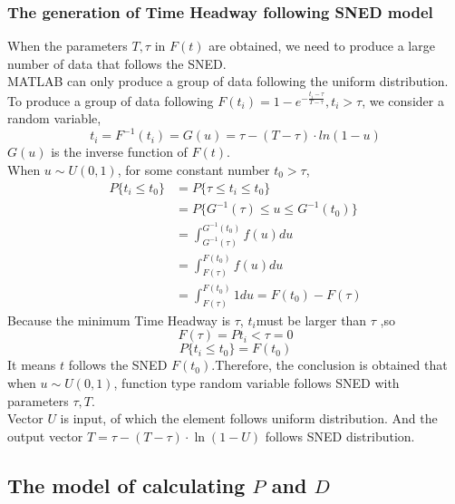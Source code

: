 \documentclass{mcmthesis}
\begin{document}
\subsubsection{The generation of Time Headway following SNED model}
\indent When the parameters $T, \tau $ in $F(t)$ are obtained, we need to produce a large number of data that follows the SNED.\\
\indent MATLAB can only produce a group of data following the uniform distribution. To produce a group of data following $ F(t_{i})=1-e^{-\frac{t_{i}-\tau}{T-\tau}},t_{i}>\tau $, we consider a random variable, 
\begin{equation}
	t_{i}=F^{-1}(t_{i})=G(u)=\tau-(T-\tau)\cdot ln(1-u)
\end{equation}
\indent $G(u)$ is the inverse function of $F(t)$.\\
\indent When $ u \sim U(0,1) $, for some constant number $t_{0}>\tau$,\\
\begin{equation}
\begin{split}
	P\{t_{i}\leqslant t_{0}\}&=P\{\tau\leqslant t_{i} \leqslant t_{0} \}\\
&=P\{ G^{-1}(\tau)\leqslant u \leqslant G^{-1}(t_{0})\}\\
&=\int_{G^{-1}(\tau)}^{G^{-1}(t_{0})}f(u)du\\
&=\int_{F(\tau)}^{F(t_{0})}f(u)du\\
&=\int_{F(\tau)}^{F(t_{0})}1du=F(t_{0})-F(\tau)
\end{split}
\end{equation}
\indent Because the minimum Time Headway is $\tau$, $ t_{i} $must be larger than $\tau$ ,so\\
\begin{equation}
	F(\tau)=P{t_{i}<\tau}=0
\end{equation}
\begin{equation}
	P\{t_{i} \leqslant t_{0} \}=F(t_{0})
\end{equation}
\indent It means $t$ follows the SNED $F(t_{0})$.Therefore, the conclusion is obtained that when $ u \sim U(0,1) $, function type random variable follows SNED with parameters $\tau , T $. \\
\indent Vector $U$ is input, of which the element follows uniform distribution. And the output vector $T=\tau-(T-\tau)\cdot \ln(1-U)$ follows SNED distribution.


\subsection{The model of calculating $P$ and $D$}
\end{document}
